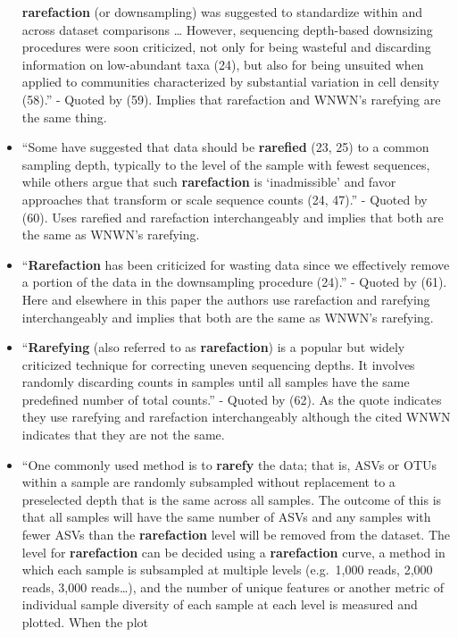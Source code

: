 \documentclass[
]{article}
\begin{document}
\begin{itemize}
  \textbf{rarefaction} (or downsampling) was suggested to standardize
  within and across dataset comparisons \ldots{} However, sequencing
  depth-based downsizing procedures were soon criticized, not only for
  being wasteful and discarding information on low-abundant taxa (24),
  but also for being unsuited when applied to communities characterized
  by substantial variation in cell density (58).'' - Quoted by (59).
  Implies that rarefaction and WNWN's rarefying are the same thing.
\item
  ``Some have suggested that data should be \textbf{rarefied} (23, 25)
  to a common sampling depth, typically to the level of the sample with
  fewest sequences, while others argue that such \textbf{rarefaction} is
  `inadmissible' and favor approaches that transform or scale sequence
  counts (24, 47).'' - Quoted by (60). Uses rarefied and rarefaction
  interchangeably and implies that both are the same as WNWN's
  rarefying.
\item
  ``\textbf{Rarefaction} has been criticized for wasting data since we
  effectively remove a portion of the data in the downsampling procedure
  (24).'' - Quoted by (61). Here and elsewhere in this paper the authors
  use rarefaction and rarefying interchangeably and implies that both
  are the same as WNWN's rarefying.
\item
  ``\textbf{Rarefying} (also referred to as \textbf{rarefaction}) is a
  popular but widely criticized technique for correcting uneven
  sequencing depths. It involves randomly discarding counts in samples
  until all samples have the same predefined number of total counts.'' -
  Quoted by (62). As the quote indicates they use rarefying and
  rarefaction interchangeably although the cited WNWN indicates that
  they are not the same.
\item
  ``One commonly used method is to \textbf{rarefy} the data; that is,
  ASVs or OTUs within a sample are randomly subsampled without
  replacement to a preselected depth that is the same across all
  samples. The outcome of this is that all samples will have the same
  number of ASVs and any samples with fewer ASVs than the
  \textbf{rarefaction} level will be removed from the dataset. The level
  for \textbf{rarefaction} can be decided using a \textbf{rarefaction}
  curve, a method in which each sample is subsampled at multiple levels
  (e.g.~1,000 reads, 2,000 reads, 3,000 reads\ldots), and the number of
  unique features or another metric of individual sample diversity of
  each sample at each level is measured and plotted. When the plot

\end{itemize}
\end{document}
